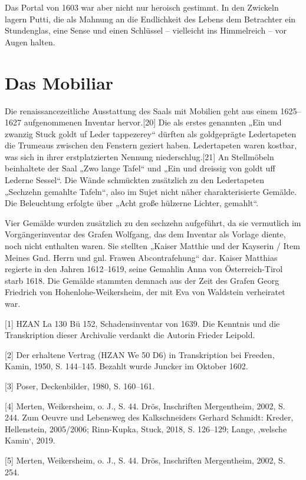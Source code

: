 \documentclass[
  a4paper,
  openany]{book}
\begin{document}
Das Portal von 1603 war aber nicht nur heroisch gestimmt. In den
Zwickeln lagern Putti, die als Mahnung an die Endlichkeit des Lebens dem
Betrachter ein Stundenglas, eine Sense und einen Schlüssel -- vielleicht
ins Himmelreich -- vor Augen halten.

\section{Das Mobiliar}\label{das-mobiliar}

Die renaissancezeitliche Ausstattung des Saals mit Mobilien geht aus
einem 1625--1627 aufgenommenen Inventar hervor.{[}20{]} Die als erstes
genannten „Ein und zwanzig Stuck goldt uf Leder tappezerey`` dürften als
goldgeprägte Ledertapeten die Trumeaus zwischen den Fenstern geziert
haben. Ledertapeten waren kostbar, was sich in ihrer erstplatzierten
Nennung niederschlug.{[}21{]} An Stellmöbeln beinhaltete der Saal „Zwo
lange Tafel`` und „Ein und dreissig von goldt uff Lederne Sessel``. Die
Wände schmückten zusätzlich zu den Ledertapeten „Sechzehn gemahlte
Tafeln``, also im Sujet nicht näher charakterisierte Gemälde. Die
Beleuchtung erfolgte über „Acht große hülzerne Lichter, gemahlt``.

Vier Gemälde wurden zusätzlich zu den sechzehn aufgeführt, da sie
vermutlich im Vorgängerinventar des Grafen Wolfgang, das dem Inventar
als Vorlage diente, noch nicht enthalten waren. Sie stellten „Kaiser
Matthie und der Kayserin / Item Meines Gnd. Herrn und gnl. Frawen
Abcontrafehung`` dar. Kaiser Matthias regierte in den Jahren 1612--1619,
seine Gemahlin Anna von Österreich-Tirol starb 1618. Die Gemälde
stammten demnach aus der Zeit des Grafen Georg Friedrich von
Hohenlohe-Weikersheim, der mit Eva von Waldstein verheiratet war.

{[}1{]} HZAN La 130 Bü 152, Schadensinventar von 1639. Die Kenntnis und
die Transkription dieser Archivalie verdankt die Autorin Frieder
Leipold.

{[}2{]} Der erhaltene Vertrag (HZAN We 50 D6) in Transkription bei
Freeden, Kamin, 1950, S. 144--145. Bezahlt wurde Juncker im Oktober
1602.

{[}3{]} Poser, Deckenbilder, 1980, S. 160--161.

{[}4{]} Merten, Weikersheim, o. J., S. 44. Drös, Inschriften
Mergentheim, 2002, S. 244. Zum Oeuvre und Lebensweg des Kalkschneiders
Gerhard Schmidt: Kreder, Hellenstein, 2005/2006; Rinn-Kupka, Stuck,
2018, S. 126--129; Lange, ‚welsche Kamin`, 2019.

{[}5{]} Merten, Weikersheim, o. J., S. 44. Drös, Inschriften
Mergentheim, 2002, S. 254.
\end{document}

